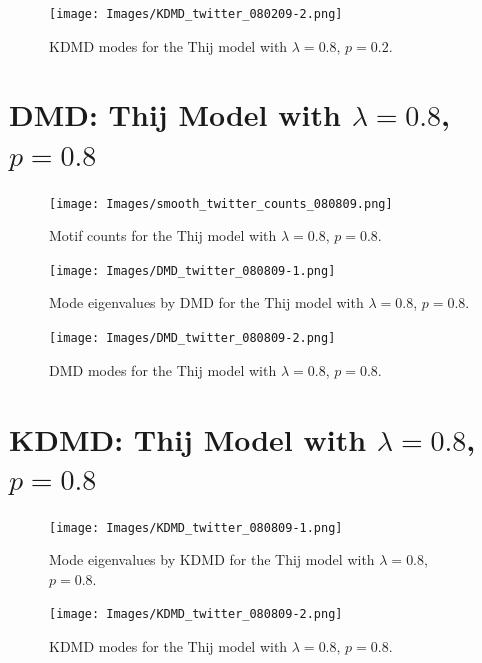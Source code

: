 \begin{figure}
    \texttt{[image: Images/KDMD\_twitter\_080209-2.png]}
    \centering
    \caption{KDMD modes for the Thij model
    with $\lambda=0.8$, $p=0.2$.}
\end{figure}

\FloatBarrier

\clearpage

\section{DMD: Thij Model with $\lambda=0.8$, $p=0.8$}
\begin{figure}
    \texttt{[image: Images/smooth\_twitter\_counts\_080809.png]}
    \centering
    \caption{Motif counts for the Thij model with $\lambda=0.8$, $p=0.8$.}
    \label{fig:pthij0808}
\end{figure}

\clearpage

\begin{figure}
    \texttt{[image: Images/DMD\_twitter\_080809-1.png]}
    \centering
    \caption{Mode eigenvalues by DMD for the Thij model
    with $\lambda=0.8$, $p=0.8$.}
    \label{fig:dmd08081}
\end{figure}

\begin{figure}
    \texttt{[image: Images/DMD\_twitter\_080809-2.png]}
    \centering
    \caption{DMD modes for the Thij model
    with $\lambda=0.8$, $p=0.8$.}
    \label{fig:dmd08082}
\end{figure}

\clearpage
\section{KDMD: Thij Model with $\lambda=0.8$, $p=0.8$}

\begin{figure}
    \texttt{[image: Images/KDMD\_twitter\_080809-1.png]}
    \centering
    \caption{Mode eigenvalues by KDMD for the Thij model
    with $\lambda=0.8$, $p=0.8$.}
    \label{fig:dmd08083}
\end{figure}

\begin{figure}
    \texttt{[image: Images/KDMD\_twitter\_080809-2.png]}
    \centering
    \caption{KDMD modes for the Thij model
    with $\lambda=0.8$, $p=0.8$.}
    \label{fig:dmd08084}
\end{figure}

\FloatBarrier
\clearpage

